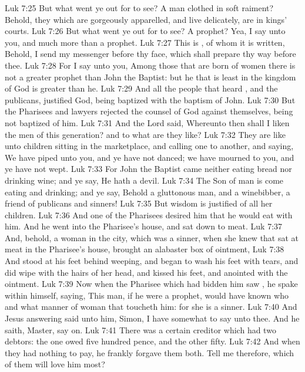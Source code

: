 \vs Luk 7:25 But what went ye out for to see? A man clothed in soft raiment? Behold, they which are gorgeously apparelled, and live delicately, are in kings' courts.
\vs Luk 7:26 But what went ye out for to see? A prophet? Yea, I say unto you, and much more than a prophet.
\vs Luk 7:27 This is , of whom it is written, Behold, I send my messenger before thy face, which shall prepare thy way before thee.
\vs Luk 7:28 For I say unto you, Among those that are born of women there is not a greater prophet than John the Baptist: but he that is least in the kingdom of God is greater than he.
\vs Luk 7:29 And all the people that heard , and the publicans, justified God, being baptized with the baptism of John.
\vs Luk 7:30 But the Pharisees and lawyers rejected the counsel of God against themselves, being not baptized of him.
\vs Luk 7:31 And the Lord said, Whereunto then shall I liken the men of this generation? and to what are they like?
\vs Luk 7:32 They are like unto children sitting in the marketplace, and calling one to another, and saying, We have piped unto you, and ye have not danced; we have mourned to you, and ye have not wept.
\vs Luk 7:33 For John the Baptist came neither eating bread nor drinking wine; and ye say, He hath a devil.
\vs Luk 7:34 The Son of man is come eating and drinking; and ye say, Behold a gluttonous man, and a winebibber, a friend of publicans and sinners!
\vs Luk 7:35 But wisdom is justified of all her children.
\vs Luk 7:36 And one of the Pharisees desired him that he would eat with him. And he went into the Pharisee's house, and sat down to meat.
\vs Luk 7:37 And, behold, a woman in the city, which was a sinner, when she knew that  sat at meat in the Pharisee's house, brought an alabaster box of ointment,
\vs Luk 7:38 And stood at his feet behind  weeping, and began to wash his feet with tears, and did wipe  with the hairs of her head, and kissed his feet, and anointed  with the ointment.
\vs Luk 7:39 Now when the Pharisee which had bidden him saw , he spake within himself, saying, This man, if he were a prophet, would have known who and what manner of woman  that toucheth him: for she is a sinner.
\vs Luk 7:40 And Jesus answering said unto him, Simon, I have somewhat to say unto thee. And he saith, Master, say on.
\vs Luk 7:41 There was a certain creditor which had two debtors: the one owed five hundred pence, and the other fifty.
\vs Luk 7:42 And when they had nothing to pay, he frankly forgave them both. Tell me therefore, which of them will love him most?
